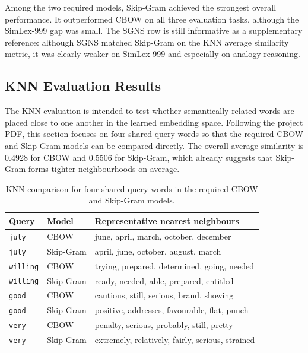 \documentclass[11pt,a4paper]{article}
\begin{document}
Among the two required models, Skip-Gram achieved the strongest overall performance. It outperformed CBOW on all three evaluation tasks, although the SimLex-999 gap was small. The SGNS row is still informative as a supplementary reference: although SGNS matched Skip-Gram on the KNN average similarity metric, it was clearly weaker on SimLex-999 and especially on analogy reasoning.

\subsection{KNN Evaluation Results}
The KNN evaluation is intended to test whether semantically related words are placed close to one another in the learned embedding space. Following the project PDF, this section focuses on four shared query words so that the required CBOW and Skip-Gram models can be compared directly. The overall average similarity is 0.4928 for CBOW and 0.5506 for Skip-Gram, which already suggests that Skip-Gram forms tighter neighbourhoods on average.

\begin{table}[H]
    \centering
    \caption{KNN comparison for four shared query words in the required CBOW and Skip-Gram models.}
    \label{tab:knn-model-examples}
    \begin{tabular}{p{}p{}p{}}
        \toprule
        Query & Model & Representative nearest neighbours \\
        \midrule
        \texttt{july} & CBOW & june, april, march, october, december \\
        \texttt{july} & Skip-Gram & april, june, october, august, march \\
        \midrule
        \texttt{willing} & CBOW & trying, prepared, determined, going, needed \\
        \texttt{willing} & Skip-Gram & ready, needed, able, prepared, entitled \\
        \midrule
        \texttt{good} & CBOW & cautious, still, serious, brand, showing \\
        \texttt{good} & Skip-Gram & positive, addresses, favourable, flat, punch \\
        \midrule
        \texttt{very} & CBOW & penalty, serious, probably, still, pretty \\
        \texttt{very} & Skip-Gram & extremely, relatively, fairly, serious, strained \\
        \bottomrule
    \end{tabular}
\end{table}
\end{document}
